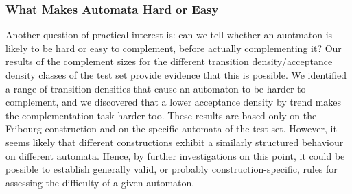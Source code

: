 
\subsubsection{What Makes Automata Hard or Easy}
Another question of practical interest is: can we tell whether an auotmaton is likely to be hard or easy to complement, before actually complementing it? Our results of the complement sizes for the different transition density/acceptance density classes of the \goal{} test set provide evidence that this is possible. We identified a range of transition densities that cause an automaton to be harder to complement, and we discovered that a lower acceptance density by trend makes the complementation task harder too. These results are based only on the Fribourg construction and on the specific automata of the \goal{} test set. However, it seems likely that different constructions exhibit a similarly structured behaviour on different automata. Hence, by further investigations on this point, it could be possible to establish generally valid, or probably construction-specific, rules for assessing the difficulty of a given automaton.

